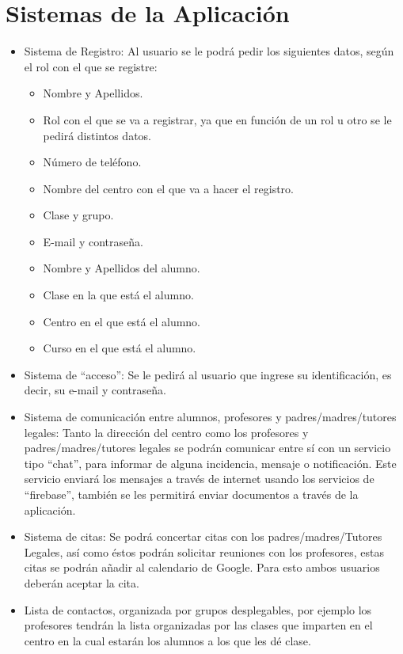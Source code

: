 \section{Sistemas de la Aplicación}

\begin{itemize}
	\item Sistema de Registro: Al usuario se le podrá pedir los siguientes datos, según el rol con el que se registre:
		\begin{itemize}
			\item Nombre y Apellidos.
			\item Rol con el que se va a registrar, ya que en función de un rol u otro se le pedirá distintos datos.
			\item Número de teléfono.
			\item Nombre del centro con el que va a hacer el registro.
			\item Clase y grupo.
			\item E-mail y contraseña.
			\item Nombre y Apellidos del alumno.
			\item Clase en la que está el alumno.
			\item Centro en el que está el alumno.
			\item Curso en el que está el alumno.
		\end{itemize}
	\item Sistema de ``acceso'': Se le pedirá al usuario que ingrese su identificación, es decir, su e-mail y contraseña.
	\item Sistema de comunicación entre alumnos, profesores y padres/madres/tutores legales: Tanto la dirección del centro como los profesores y padres/madres/tutores legales se podrán comunicar entre sí con un servicio tipo ``chat'', para informar de alguna incidencia, mensaje o notificación. Este servicio enviará los mensajes a través de internet usando los servicios de ``firebase'', también se les permitirá enviar documentos a través de la aplicación.
	\item Sistema de citas: Se podrá concertar citas con los padres/madres/Tutores Legales, así como éstos podrán solicitar reuniones con los profesores, estas citas se podrán añadir al calendario de Google. Para esto ambos usuarios deberán aceptar la cita.
	\item Lista de contactos, organizada por grupos desplegables, por ejemplo los profesores tendrán la lista organizadas por las clases que imparten en el centro en la cual estarán los alumnos a los que les dé clase.
\end{itemize}

